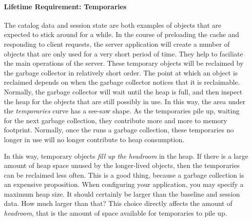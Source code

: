 \paragraph{Lifetime Requirement: Temporaries}
The catalog data and session state are both examples of objects that are expected
to stick around for a while. In the course of preloading the cache and responding
to client requests, the server application will create a number of objects that
are only used for a very short period of time. They help to faciliate the main
operations of the server. These temporary objects will be reclaimed by the \jres
garbage collector in relatively short order. The point at which an object is
reclaimed depends on when the garbage collector notices that it is reclaimable.
Normally, the garbage collector will wait until the heap is full, and then
inspect the heap for the objects that are still possibly in use. In this way, the
area under the \emph{temporaries} curve has a see-saw shape. As the temporaries
pile up, waiting for the next garbage collection, they contribute more and more
to memory footprint. Normally, once the \jre runs a garbage collection, these
temporaries no longer in use will no longer contribute to heap consumption.

In this way, temporary objects
\emph{fill up the headroom} in the heap. If there is a
large amount of heap space unused by the longer-lived objects, then the
temporaries can be reclaimed less often. This is a good thing, because a
garbage collection is an expensive proposition.
  
When configuring your application, you may specify a maximum heap size. It
should certainly be larger than the baseline and session data. How much
larger than that? This choice directly affects the amount of \emph{headroom},
 that is the amount of space available for temporaries to pile up.

